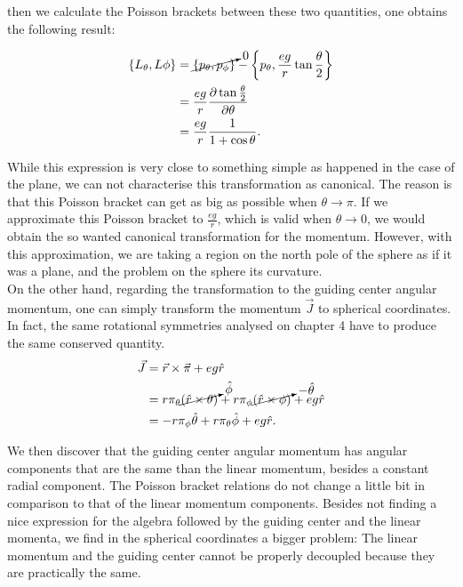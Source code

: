 then we calculate the Poisson brackets between these two quantities, one obtains the following result:

\begin{align*}
\left\lbrace L_\theta, L\phi \right\rbrace &= \cancelto{0}{\left\lbrace p_\theta, p_\phi \right\rbrace}-\left\lbrace p_\theta, \frac{eg}{r}\tan{\frac{\theta}{2}} \right\rbrace\\
&= \frac{eg}{r}\frac{\partial \tan{\frac{\theta}{2}} }{\partial \theta}\\
&=  \frac{eg}{r} \frac{1}{1+\cos{\theta}}.
\end{align*}

While this expression is very close to something simple as happened in the case of the plane, we can not characterise this transformation as canonical. The reason is that this Poisson bracket can get as big as possible when $\theta \to \pi$. If we approximate this Poisson bracket to $\frac{eg}{r}$, which is valid when $\theta \to 0$, we would obtain the so wanted canonical transformation for the momentum. However, with this approximation, we are taking a region on the north pole of the sphere as if it was a plane, and the problem on the sphere its curvature.\\

On the other hand, regarding the transformation to the guiding center angular momentum, one can simply transform the momentum $\vec{J}$ to spherical coordinates. In fact, the same rotational symmetries analysed on chapter 4 have to produce the same conserved quantity.\\

\begin{align*}
\vec{J} &= \vec{r}\times\vec{\pi} + eg\hat{r}\\
&= r\pi_\theta \cancelto{\hat{\phi}}{(\hat{r}\times \theta)} + r\pi_\phi \cancelto{-\hat{\theta}}{(\hat{r}\times \phi)} + eg\hat{r}\\
&= -r\pi_\phi \hat{\theta} + r\pi_\theta \hat{\phi} + eg\hat{r}.
\end{align*}

We then discover that the guiding center angular momentum has angular components that are the same than the linear momentum, besides a constant radial component. The Poisson bracket relations do not change a little bit in comparison to that of the linear momentum components. Besides not finding a nice expression for the algebra followed by the guiding center and the linear momenta, we find in the spherical coordinates a bigger problem: The linear momentum and the guiding center cannot be properly decoupled because they are practically the same.\\

